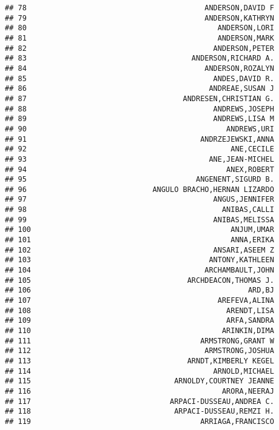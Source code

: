 \documentclass[
]{article}
\begin{document}
\begin{verbatim}
## 78                                         ANDERSON,DAVID F
## 79                                         ANDERSON,KATHRYN
## 80                                            ANDERSON,LORI
## 81                                            ANDERSON,MARK
## 82                                           ANDERSON,PETER
## 83                                      ANDERSON,RICHARD A.
## 84                                         ANDERSON,ROZALYN
## 85                                           ANDES,DAVID R.
## 86                                          ANDREAE,SUSAN J
## 87                                    ANDRESEN,CHRISTIAN G.
## 88                                           ANDREWS,JOSEPH
## 89                                           ANDREWS,LISA M
## 90                                              ANDREWS,URI
## 91                                        ANDRZEJEWSKI,ANNA
## 92                                               ANE,CECILE
## 93                                          ANE,JEAN-MICHEL
## 94                                              ANEX,ROBERT
## 95                                       ANGENENT,SIGURD B.
## 96                             ANGULO BRACHO,HERNAN LIZARDO
## 97                                           ANGUS,JENNIFER
## 98                                             ANIBAS,CALLI
## 99                                           ANIBAS,MELISSA
## 100                                              ANJUM,UMAR
## 101                                              ANNA,ERIKA
## 102                                          ANSARI,ASEEM Z
## 103                                         ANTONY,KATHLEEN
## 104                                        ARCHAMBAULT,JOHN
## 105                                    ARCHDEACON,THOMAS J.
## 106                                                  ARD,BJ
## 107                                           AREFEVA,ALINA
## 108                                             ARENDT,LISA
## 109                                             ARFA,SANDRA
## 110                                            ARINKIN,DIMA
## 111                                       ARMSTRONG,GRANT W
## 112                                        ARMSTRONG,JOSHUA
## 113                                    ARNDT,KIMBERLY KEGEL
## 114                                          ARNOLD,MICHAEL
## 115                                 ARNOLDY,COURTNEY JEANNE
## 116                                            ARORA,NEERAJ
## 117                                ARPACI-DUSSEAU,ANDREA C.
## 118                                 ARPACI-DUSSEAU,REMZI H.
## 119                                       ARRIAGA,FRANCISCO

\end{verbatim}
\end{document}

